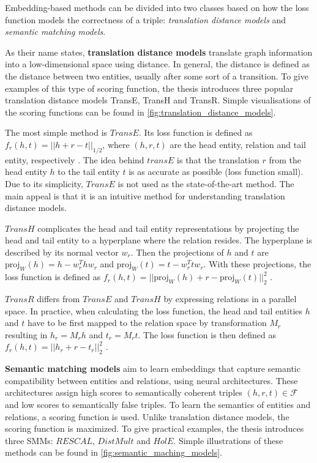 \documentclass[english, 12pt, a4paper, sci, utf8, a-2b, online]{aaltothesis}
\begin{document}
Embedding-based methods can be divided into two classes based on how the loss function models the correctness of a triple: \textit{translation distance models} and \textit{semantic matching models}.



As their name states, \textbf{translation distance models} translate graph information into a low-dimensional space using distance. In general, the distance is defined as the distance between two entities, usually after some sort of a transition. To give examples of this type of scoring function, the thesis introduces three popular translation distance models TransE, TransH and TransR. Simple visualisations of the scoring functions can be found in \autoref{fig:translation_distance_models}.

The most simple method is $TransE$. Its loss function is defined as $f_r(h,t) = ||h + r - t||_{1/2}$, where $(h,r,t)$ are the head entity, relation and tail entity, respectively \parencite{ZHANG2024123876}. The idea behind $transE$ is that the translation $r$ from the head entity $h$ to the tail entity $t$ is as accurate as possible (loss function small). Due to its simplicity, $TransE$ is not used as the state-of-the-art method. The main appeal is that it is an intuitive method for understanding translation distance models.

$TransH$ complicates the head and tail entity representations by projecting the head and tail entity to a hyperplane where the relation resides. The hyperplane is described by its normal vector $w_r$. Then the projections of $h$ and $t$ are $\text{proj}_W(h) = h - w_r^Thw_r$ and $\text{proj}_W(t) = t - w_r^Ttw_r$. With these projections, the loss function is defined as $f_r(h,t) = ||\text{proj}_W(h) + r - \text{proj}_W(t)||_2^2$ \parencite{ZHANG2024123876}.

$TransR$ differs from $TransE$ and $TransH$ by expressing relations in a parallel space. In practice, when calculating the loss function, the head and tail entities $h$ and $t$ have to be first mapped to the relation space by transformation $M_r$ resulting in $h_r = M_rh$ and $t_r = M_rt$. The loss function is then defined as $f_r(h,t) = ||h_r + r - t_r||^2_2$ \parencite{ZHANG2024123876}. 



\textbf{Semantic matching models} aim to learn embeddings that capture semantic compatibility between entities and relations, using neural architectures. These architectures assign high scores to semantically coherent triples $(h,r,t) \in \mathcal{F}$ and low scores to semantically false triples. To learn the semantics of entities and relations, a scoring function is used. Unlike translation distance models, the scoring function is maximized. To give practical examples, the thesis introduces three SMMs: $RESCAL$, $DistMult$ and $HolE$. Simple illustrations of these methods can be found in \autoref{fig:semantic_maching_models}.
\end{document}

